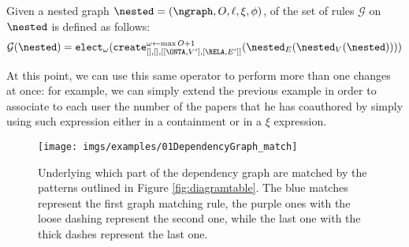 \begin{definition}[continues=def:gggintro]
	 Given a nested graph $\nested=(\ngraph,O,\ell,\xi,\phi)$, of the set of rules $\mathcal{G}$ on $\nested$ is defined as follows:
\[\mathcal{G}(\nested)=\texttt{elect}_{\omega}(\texttt{create}_{[],[],[[\ONTA,V'],[\RELA,E']]}^{\omega\leftarrow\max O+1}(\nested_E(\nested_V(\nested))))\]
\end{definition}

At this point, we can use this same operator to perform more than one changes at once: for example, we can simply extend the previous example in order to associate to each user the number of the papers that he has coauthored by simply using such expression either in a containment or in a $\xi$ expression.


\begin{figure*}[!pth]
	\centering
	\texttt{[image: imgs/examples/01DependencyGraph\_match]}
	\caption{Underlying which part of the dependency graph are matched by the patterns outlined in Figure \vref{fig:diagramtable}. The blue matches represent the first graph matching rule, the purple ones with the loose dashing represent the second one, while the last one with the thick dashes represent the last one.}
	\label{fig:dependencygraph_matches}
\end{figure*}



